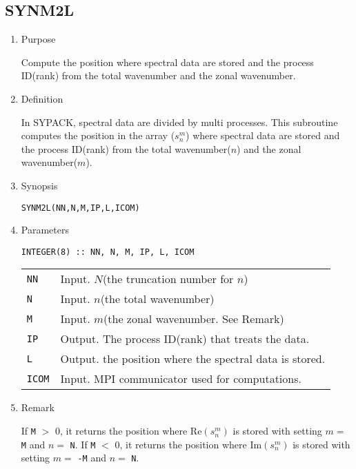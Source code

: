 \documentclass[a4paper]{scrartcl}
\begin{document}

\subsection{SYNM2L}

\begin{enumerate}

\item Purpose

Compute the position where spectral data are stored
and the process ID(rank)
from the total wavenumber and the zonal wavenumber.

\item Definition

In SYPACK, spectral data are divided by multi processes.
This subroutine computes 
the position in the array ($s^m_n$)
where spectral data are stored and the process ID(rank)
from the total wavenumber($n$) and the zonal wavenumber($m$).
  
\item Synopsis 
    
\texttt{SYNM2L(NN,N,M,IP,L,ICOM)}
  
\item Parameters

\begin{verbatim}
INTEGER(8) :: NN, N, M, IP, L, ICOM
\end{verbatim}    

\begin{tabular}{ll}
\texttt{NN} & Input. $N$(the truncation number for $n$)\\
\texttt{N} & Input. $n$(the total wavenumber)\\
\texttt{M} & Input. $m$(the zonal wavenumber. See Remark)\\
\texttt{IP} & Output. The process ID(rank) that treats
the data.\\
\texttt{L} & Output. the position where the spectral
data is stored.\\
\texttt{ICOM} & Input. MPI communicator used for computations.
\end{tabular}

\item Remark

If \texttt{M} $>$ 0, it returns the position where
$\mbox{Re}(s^m_n)$ is stored with setting 
$m=$ \texttt{M} and $n=$ \texttt{N}.
If \texttt{M} $<$ 0, it returns the position where
$\mbox{Im}(s^m_n)$ is stored with setting 
$m=$ \texttt{-M} and $n=$ \texttt{N}.

\end{enumerate}
\end{document}
